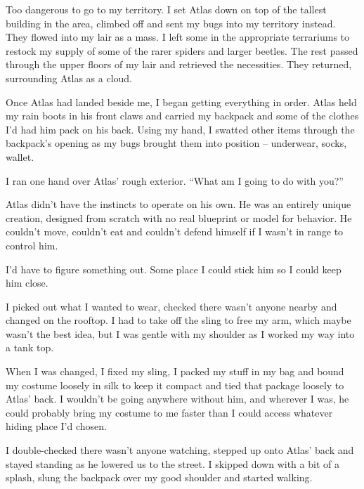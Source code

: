 Too dangerous to go to my territory.  I set Atlas down on top of the tallest building in the area, climbed off and sent my bugs into my territory instead.  They flowed into my lair as a mass.  I left some in the appropriate terrariums to restock my supply of some of the rarer spiders and larger beetles.  The rest passed through the upper floors of my lair and retrieved the necessities.  They returned, surrounding Atlas as a cloud.



Once Atlas had landed beside me, I began getting everything in order.  Atlas held my rain boots in his front claws and carried my backpack and some of the clothes I'd had him pack on his back.  Using my hand, I swatted other items through the backpack's opening as my bugs brought them into position – underwear, socks, wallet.



I ran one hand over Atlas' rough exterior.  ``What am I going to do with you?''



Atlas didn't have the instincts to operate on his own.  He was an entirely unique creation, designed from scratch with no real blueprint or model for behavior.  He couldn't move, couldn't eat and couldn't defend himself if I wasn't in range to control him.



I'd have to figure something out.  Some place I could stick him so I could keep him close.



I picked out what I wanted to wear, checked there wasn't anyone nearby and changed on the rooftop.  I had to take off the sling to free my arm, which maybe wasn't the best idea, but I was gentle with my shoulder as I worked my way into a tank top.



When I was changed, I fixed my sling, I packed my stuff in my bag and bound my costume loosely in silk to keep it compact and tied that package loosely to Atlas' back.  I wouldn't be going anywhere without him, and wherever I was, he could probably bring my costume to me faster than I could access whatever hiding place I'd chosen.



I double-checked there wasn't anyone watching, stepped up onto Atlas' back and stayed standing as he lowered us to the street.  I skipped down with a bit of a splash, slung the backpack over my good shoulder and started walking.



